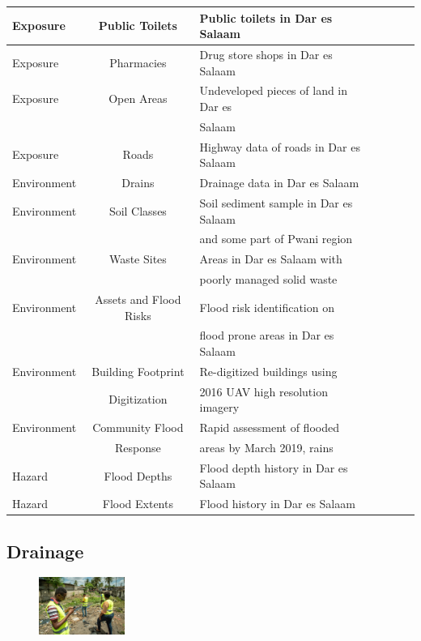 \documentclass[a4paper,12pt,twoside]{article}
\begin{document}
\begin{tabular}{|l|c|l|c|l|c|l|}
\hline
Exposure & Public Toilets & Public toilets in Dar es Salaam\\
\hline
Exposure & Pharmacies & Drug store shops in Dar es Salaam\\
\hline
Exposure & Open Areas & Undeveloped pieces of land in Dar es \\
{} & {} & Salaam\\
\hline
Exposure & Roads & Highway data of roads in Dar es Salaam\\
\hline
Environment & Drains & Drainage data in Dar es Salaam\\
\hline
Environment & Soil Classes & Soil sediment sample in Dar es Salaam\\
{} & {} & and some part of Pwani region\\
\hline
Environment & Waste Sites & Areas in Dar es Salaam with\\
{} & {} & poorly managed solid waste\\
\hline
Environment & Assets and Flood Risks & Flood risk identification on\\
{} & {} & flood prone areas in Dar es Salaam\\
\hline
Environment & Building Footprint & Re-digitized buildings using\\
{} & Digitization  & 2016 UAV high resolution imagery\\
\hline
Environment & Community Flood & Rapid assessment of flooded\\
{} & Response & areas by March 2019, rains\\
\hline
Hazard & Flood Depths & Flood depth history in Dar es Salaam\\
\hline
Hazard & Flood Extents & Flood history in Dar es Salaam\\
\hline
\end{tabular}

\subsection{Drainage}
\begin{figure} %
    \centering
    \includegraphics[width=0.25\textwidth]{images/Drainage_Mapping.jpg}
\end{figure}
\end{document}
